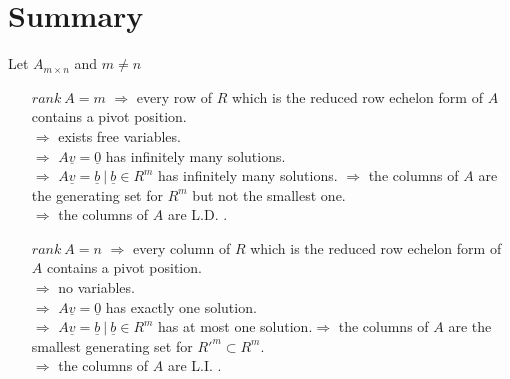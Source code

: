 \documentclass[12pt]{article}
\begin{document}
\section{Summary}
Let $A_{m\times n}$ and $m \neq n$
\begin{itemize}
\item[$rank\ A=m$] 
$\Rightarrow$ every row of $R$ which is the reduced row echelon form of $A$ contains a pivot position.
\\$\Rightarrow$ exists free variables.
\\$\Rightarrow$ $A\underline{v}=\underline{0}$ has infinitely many solutions.
\\$\Rightarrow$ $A\underline{v}=\underline{b}\ |\ \underline{b} \in R^m$ has infinitely many solutions. $\Rightarrow$ the columns of $A$ are the generating set for $R^m$ but not the smallest one.
\\$\Rightarrow$ the columns of $A$ are L.D. .
\item[$rank\ A=n$]
$\Rightarrow$ every column of $R$ which is the reduced row echelon form of $A$ contains a pivot position.
\\$\Rightarrow$ no variables.
\\$\Rightarrow$ $A\underline{v}=\underline{0}$ has exactly one solution.
\\$\Rightarrow$ $A\underline{v}=\underline{b}\ |\ \underline{b} \in R^m$ has at most one solution.$\Rightarrow$ the columns of $A$ are the smallest generating set for $R'^m \subset R^m$.
\\$\Rightarrow$ the columns of $A$ are L.I. .
\end{itemize}
\end{document}
